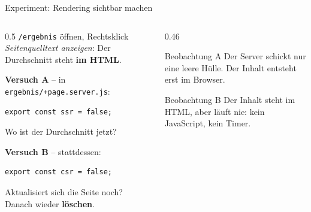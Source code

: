 \begin{frame}[fragile]{Experiment: Rendering sichtbar machen}
  \footnotesize
  \begin{columns}[onlytextwidth,t]
    \begin{column}{0.5\textwidth}
      \texttt{/ergebnis} öffnen, Rechtsklick \textarrow{}
      \emph{Seitenquelltext anzeigen}: Der Durchschnitt steht \textbf{im HTML}.

      \vspace{0.4em}
      \textbf{Versuch A} -- in \texttt{ergebnis/+page.server.js}:
\begin{lstlisting}[style=js,numbers=none]
export const ssr = false;
\end{lstlisting}
      Wo ist der Durchschnitt jetzt?

      \vspace{0.4em}
      \textbf{Versuch B} -- stattdessen:
\begin{lstlisting}[style=js,numbers=none]
export const csr = false;
\end{lstlisting}
      Aktualisiert sich die Seite noch? Danach wieder \textbf{löschen}.
    \end{column}
    \begin{column}{0.46\textwidth}
      \begin{block}{Beobachtung A}
        \footnotesize Der Server schickt nur eine leere Hülle. Der Inhalt entsteht
        erst im Browser.
      \end{block}
      \begin{block}{Beobachtung B}
        \footnotesize Der Inhalt steht im HTML, aber  läuft nie:
        kein JavaScript, kein Timer.
      \end{block}
    \end{column}
  \end{columns}
\end{frame}


